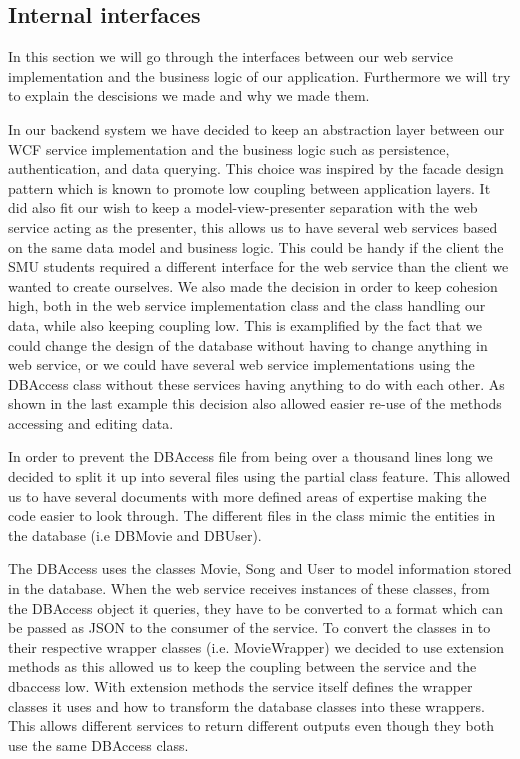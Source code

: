 \subsection{Internal interfaces}
In this section we will go through the interfaces between our web service implementation and the business logic of our application. Furthermore we will try to explain the descisions we made and why we made them.

In our backend system we have decided to keep an abstraction layer between our WCF service implementation and the business logic such as persistence, authentication, and data querying. This choice was inspired by the facade design pattern which is known to promote low coupling between application layers. It did also fit our wish to keep a model-view-presenter separation with the web service acting as the presenter, this allows us to have several web services based on the same data model and business logic. This could be handy if the client the SMU students required a different interface for the web service than the client we wanted to create ourselves. We also made the decision in order to keep cohesion high, both in the web service implementation class and the class handling our data, while also keeping coupling low. This is examplified by the fact that we could change the design of the database without having to change anything in web service, or we could have several web service implementations using the DBAccess class without these services having anything to do with each other. As shown in the last example this decision also allowed easier re-use of the methods accessing and editing data.

In order to prevent the DBAccess file from being over a thousand lines long we decided to split it up into several files using the partial class feature. This allowed us to have several documents with more defined areas of expertise making the code easier to look through.  The different files in the class mimic the entities in the database (i.e DBMovie and DBUser).

The DBAccess uses the classes Movie, Song and User to model information stored in the database. When the web service receives instances of these classes, from the DBAccess object it queries, they have to be converted to a format which can be passed as JSON to the consumer of the service. To convert the classes in to their respective wrapper classes (i.e. MovieWrapper) we decided to use extension methods as this allowed us to keep the coupling between the service and the dbaccess low. With extension methods the service itself defines the wrapper classes it uses and how to transform the database classes into these wrappers. This allows different services to return different outputs even though they both use the same DBAccess class.